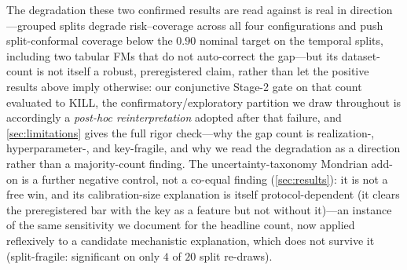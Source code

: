 \documentclass[pdflatex,sn-mathphys-num]{sn-jnl}
\begin{document}
The degradation these two confirmed results are read against is real in direction---grouped splits degrade
risk--coverage across all four configurations and push split-conformal coverage below the $0.90$ nominal
target on the temporal splits, including two tabular FMs that do not auto-correct the gap---but its
dataset-count is not itself a robust, preregistered claim, rather than let the
positive results above imply otherwise: our conjunctive Stage-2 gate on that count evaluated to KILL, the
confirmatory/exploratory partition we draw throughout is accordingly a \emph{post-hoc reinterpretation}
adopted after that failure, and \cref{sec:limitations} gives the full rigor check---why the gap count is
realization-, hyperparameter-, and key-fragile, and why we read the degradation as a direction rather than a
majority-count finding. The uncertainty-taxonomy Mondrian add-on is a further negative control, not a
co-equal finding (\cref{sec:results}): it is not a free win, and its calibration-size explanation is itself
protocol-dependent (it clears the preregistered bar with the key as a feature but not without it)---an
instance of the same sensitivity we document for the headline count, now applied reflexively to a candidate
mechanistic explanation, which does not survive it (split-fragile: significant on only $4$ of $20$ split
re-draws).
\end{document}
